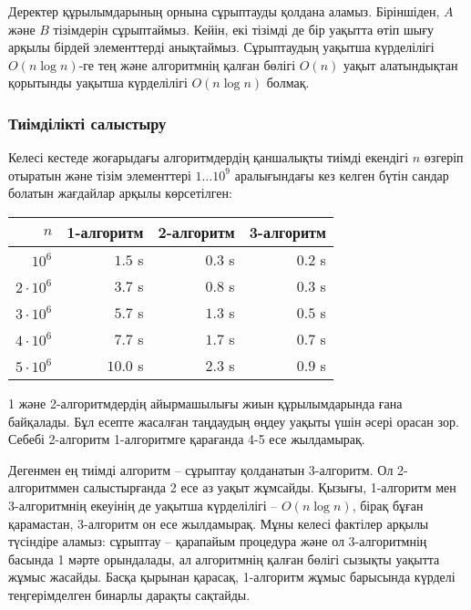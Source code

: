 Деректер құрылымдарының орнына сұрыптауды қолдана аламыз. 
Біріншіден, $A$ және $B$ тізімдерін сұрыптаймыз. Кейін, 
екі тізімді де бір уақытта өтіп шығу арқылы бірдей элементтерді анықтаймыз.
Сұрыптаудың уақытша күрделілігі $O(n \log n)$-ге тең және алгоритмнің қалған бөлігі
$O(n)$ уақыт алатындықтан қорытынды уақытша күрделілігі $O(n \log n)$ болмақ.

\subsubsection{Тиімділікті салыстыру}

Келесі кестеде жоғарыдағы алгоритмдердің 
қаншалықты тиімді екендігі $n$ өзгеріп отыратын және 
тізім элементтері $1 \ldots 10^9$ аралығындағы
кез келген бүтін сандар болатын жағдайлар арқылы көрсетілген:

\begin{center}
\begin{tabular}{rrrr}
$n$ & 1-алгоритм & 2-алгоритм & 3-алгоритм \\
\hline
$10^6$ & $1.5$ s & $0.3$ s & $0.2$ s \\
$2 \cdot 10^6$ & $3.7$ s & $0.8$ s & $0.3$ s \\
$3 \cdot 10^6$ & $5.7$ s & $1.3$ s & $0.5$ s \\
$4 \cdot 10^6$ & $7.7$ s & $1.7$ s & $0.7$ s \\
$5 \cdot 10^6$ & $10.0$ s & $2.3$ s & $0.9$ s \\
\end{tabular}
\end{center}

1 және 2-алгоритмдердің айырмашылығы жиын құрылымдарында ғана байқалады. 
Бұл есепте жасалған таңдаудың өңдеу уақыты үшін әсері орасан зор. 
Себебі 2-алгоритм 1-алгоритмге қарағанда 4-5 есе жылдамырақ.

Дегенмен ең тиімді алгоритм -- сұрыптау қолданатын 3-алгоритм.
Ол 2-алгоритммен салыстырғанда 2 есе аз уақыт жұмсайды.
Қызығы, 1-алгоритм мен 3-алгоритмнің екеуінің де уақытша күрделілігі -- $O(n \log n)$,
бірақ бұған қарамастан, 3-алгоритм он есе жылдамырақ.
Мұны келесі фактілер арқылы түсіндіре аламыз: 
сұрыптау -- қарапайым процедура және ол 3-алгоритмнің
басында  1 мәрте орындалады, ал алгоритмнің қалған бөлігі
сызықты уақытта жұмыс жасайды. Басқа қырынан қарасақ, 
1-алгоритм жұмыс барысында күрделі теңгерімделген бинарлы дарақты сақтайды.
